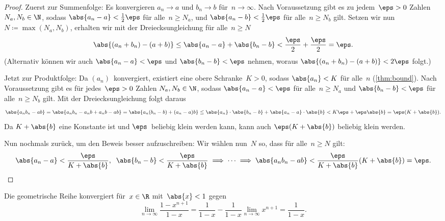 \documentclass[a4paper]{article}
\begin{document}
\begin{proof}
    Zuerst zur Summenfolge: Es konvergieren $a_n \to a$ und $b_n \to b$ für~$n \to \infty$. Nach Voraussetzung gibt es zu jedem~$\eps > 0$ Zahlen $N_a, N_b \in \N$, sodass $\abs{a_n-a} < \frac{1}{2}\eps$ für alle~$n \geq N_a$, und $\abs{a_n-b} < \frac{1}{2}\eps$ für alle~$n \geq N_b$ gilt. Setzen wir nun $N \coloneqq \max(N_a, N_b)$, erhalten wir mit der Dreiecksungleichung für alle~$n \geq N$
    \begin{equation*}
        \abs{(a_n+b_n) - (a+b)} \leq \abs{a_n-a} + \abs{b_n-b} < \frac{\eps}{2} + \frac{\eps}{2} = \eps.
    \end{equation*}
    (Alternativ können wir auch $\abs{a_n-a} < \eps$ und $\abs{b_n-b} < \eps$ nehmen, woraus $\abs{(a_n+b_n) - (a+b)} < 2\eps$ folgt.)

    Jetzt zur Produktfolge: Da $(a_n)$~konvergiert, existiert eine obere Schranke~$K > 0$, sodass $\abs{a_n} < K$ für alle~$n$ (\cref{thm:bound}). Nach Voraussetzung gibt es für jedes~$\eps > 0$ Zahlen $N_a, N_b \in \N$, sodass $\abs{a_n-a} < \eps$ für alle~$n \geq N_a$ und $\abs{b_n-b} < \eps$ für alle~$n \geq N_b$ gilt. Mit der Dreiecksungleichung folgt daraus
    \begin{equation*}
        \abs{a_nb_n - ab} = \abs{a_nb_n - a_nb + a_nb - ab} = \abs{a_n(b_n-b) + (a_n-a)b} \leq \abs{a_n} \cdot \abs{b_n-b} + \abs{a_n-a} \cdot \abs{b} < K\eps + \eps\abs{b} = \eps (K+\abs{b}).
    \end{equation*}
    Da $K+\abs{b}$ eine Konstante ist und $\eps$~beliebig klein werden kann, kann auch $\eps (K+\abs{b})$ beliebig klein werden.

    Nun nochmals zurück, um den Beweis besser aufzuschreiben: Wir wählen nun~$N$ so, dass für alle~$n \geq N$ gilt:
    \begin{equation*}
        \abs{a_n-a} < \frac{\eps}{K+\abs{b}},\;\; \abs{b_n-b} < \frac{\eps}{K+\abs{b}} \implies \dots \implies \abs{a_nb_n - ab} < \frac{\eps}{K+\abs{b}} (K+\abs{b}) = \eps. \qedhere
    \end{equation*}
\end{proof}

\begin{example}
    Die geometrische Reihe konvergiert für~$x \in \R$ mit~$\abs{x} < 1$ gegen
    \begin{equation*}
        \lim_{n\to\infty} \frac{1-x^{n+1}}{1-x} = \frac{1}{1-x} - \frac{1}{1-x} \lim_{n\to\infty} x^{n+1} = \frac{1}{1-x}.
    \end{equation*}
\end{example}
\end{document}
